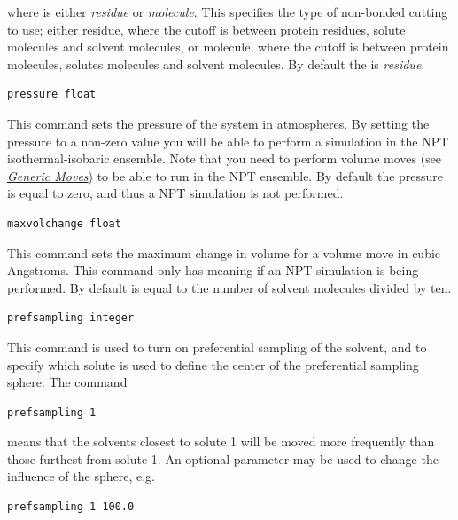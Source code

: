 \documentclass[letterpaper,10pt,english]{sphinxmanual}
\begin{document}
where  is either \emph{residue} or \emph{molecule}. This specifies the type of non-bonded cutting to use; either residue, where the cutoff is between protein residues, solute molecules and solvent molecules, or molecule, where the cutoff is between protein molecules, solutes molecules and solvent molecules. By default the  is \emph{residue}.

\begin{Verbatim}[commandchars=\\\{\}]
pressure float
\end{Verbatim}

This command sets the pressure of the system in atmospheres. By setting the pressure to a non-zero value you will be able to perform a simulation in the NPT isothermal-isobaric ensemble. Note that you need to perform volume moves (see {\hyperref[protoms:moves]{\emph{Generic Moves}}}) to be able to run in the NPT ensemble. By default the pressure is equal to zero, and thus a NPT simulation is not performed.

\begin{Verbatim}[commandchars=\\\{\}]
maxvolchange float
\end{Verbatim}

This command sets the maximum change in volume for a volume move in cubic Angstroms. This command only has meaning if an NPT simulation is being performed. By default  is equal to the number of solvent molecules divided by ten.

\begin{Verbatim}[commandchars=\\\{\}]
prefsampling integer
\end{Verbatim}

This command is used to turn on preferential sampling of the solvent, and to specify which solute is used to define the center of the preferential sampling sphere. The command

\begin{Verbatim}[commandchars=\\\{\}]
prefsampling 1
\end{Verbatim}

means that the solvents closest to solute 1 will be moved more frequently than those furthest from solute 1. An optional parameter may be used to change the influence of the sphere, e.g.

\begin{Verbatim}[commandchars=\\\{\}]
prefsampling 1 100.0
\end{Verbatim}
\end{document}
